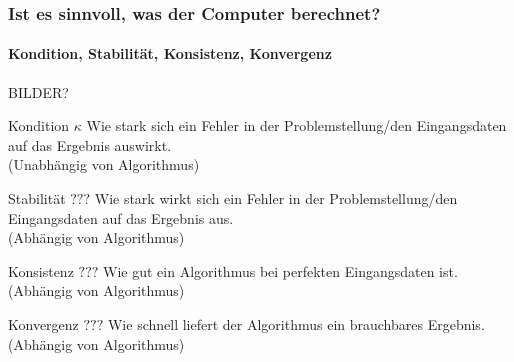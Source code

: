 \documentclass{beamer}
\begin{document}
\begin{frame}\frametitle{Ist es sinnvoll, was der Computer berechnet?}
  \framesubtitle{Kondition, Stabilität, Konsistenz, Konvergenz}

   BILDER?
  \begin{block}{Kondition $\kappa$}
    Wie stark sich ein Fehler in der Problemstellung/den Eingangsdaten auf das Ergebnis auswirkt. \\
    (Unabhängig von Algorithmus)
  \end{block}
  \pause
  \begin{block}{Stabilität $???$}
    Wie stark wirkt sich ein Fehler in der Problemstellung/den Eingangsdaten auf das Ergebnis aus. \\
    (Abhängig von Algorithmus)
  \end{block}
  \pause
  
  \begin{block}{Konsistenz $???$}
    Wie gut ein Algorithmus bei perfekten Eingangsdaten ist. \\
    (Abhängig von Algorithmus)
  \end{block}
  \pause
  
  \begin{block}{Konvergenz $???$}
    Wie schnell liefert der Algorithmus ein brauchbares Ergebnis. \\
    (Abhängig von Algorithmus)
  \end{block}
\end{frame} 





\end{document}
